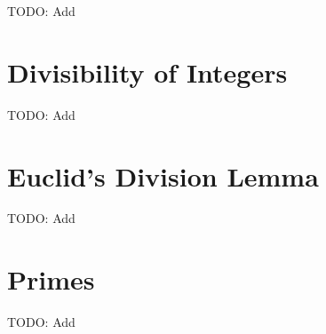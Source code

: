 TODO: Add

\section{Divisibility of Integers}
TODO: Add


\section{Euclid's Division Lemma}
TODO: Add




\section{Primes}
TODO: Add



